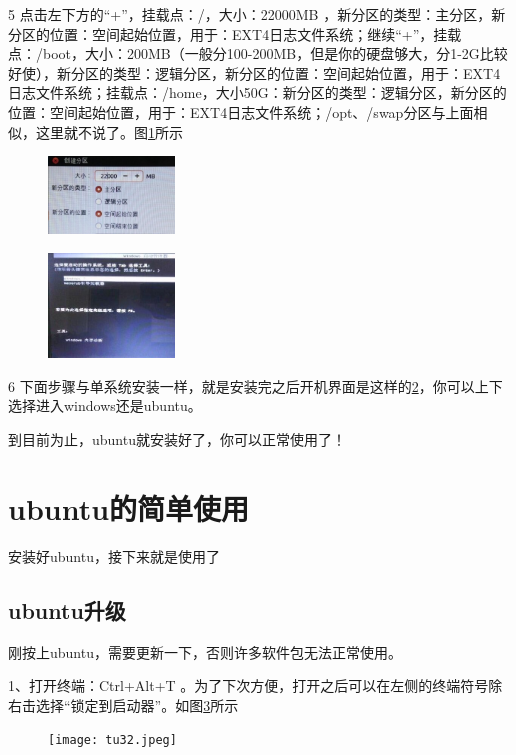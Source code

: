 \documentclass[12pt]{article}
\begin{document}
5 点击左下方的“+”，挂载点：/，大小：22000MB ，新分区的类型：主分区，新分区的位置：空间起始位置，用于：EXT4日志文件系统；继续“+”，挂载点：/boot，大小：200MB（一般分100-200MB，但是你的硬盘够大，分1-2G比较好使），新分区的类型：逻辑分区，新分区的位置：空间起始位置，用于：EXT4日志文件系统；挂载点：/home，大小50G：新分区的类型：逻辑分区，新分区的位置：空间起始位置，用于：EXT4日志文件系统；/opt、/swap分区与上面相似，这里就不说了。图\ref{tu24}所示
\begin{figure}[!htb] %
\centering
\includegraphics[width=0.3\textwidth]{tu24.jpeg}
\caption{}
\label{tu24}
\end{figure} 
\begin{figure}[!htb] %
\centering
\includegraphics[width=0.3\textwidth]{tu25.jpeg}
\caption{}
\label{tu25}
\end{figure} 

6 下面步骤与单系统安装一样，就是安装完之后开机界面是这样的\ref{tu25}，你可以上下选择进入windows还是ubuntu。

到目前为止，ubuntu就安装好了，你可以正常使用了！
\section{ubuntu的简单使用}
 安装好ubuntu，接下来就是使用了
\subsection{ubuntu升级}
  刚按上ubuntu，需要更新一下，否则许多软件包无法正常使用。

 1、打开终端：Ctrl+Alt+T 。为了下次方便，打开之后可以在左侧的终端符号除右击选择“锁定到启动器”。如图\ref{tu32}所示

\begin{figure}[!htb] %
\centering
\texttt{[image: tu32.jpeg]}
\caption{}
\label{tu32}
\end{figure} 
\end{document}
